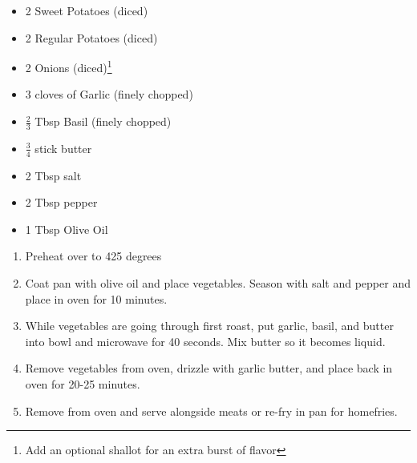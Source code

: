 \documentclass[oneside]{recipe}
\newcommand{\recipecolumn}[2]{
	\begin{multicols}{2}
	\raggedcolumns
	#1
	\columnbreak
	#2
	\end{multicols}
}
\begin{document}
\newpage
{}
\recipecolumn{
	\begin{itemize}
		\item 2 Sweet Potatoes (diced)
		\item 2 Regular Potatoes (diced)
		\item 2 Onions (diced)\footnote{Add an optional shallot for an extra burst of flavor}
		\item 3 cloves of Garlic (finely chopped)
		\item $\frac{2}{3}$ Tbsp Basil (finely chopped)
		\item $\frac{3}{4}$ stick butter
		\item 2 Tbsp salt
		\item 2 Tbsp pepper
		\item 1 Tbsp Olive Oil
	\end{itemize}
}{
	\begin{enumerate}
		\item Preheat over to 425 degrees
		\item Coat pan with olive oil and place vegetables. Season with salt and pepper and place in oven for 10 minutes. 
		\item While vegetables are going through first roast, put garlic, basil, and butter into bowl and microwave for 40 seconds. Mix butter so it becomes liquid. 
		\item Remove vegetables from oven, drizzle with garlic butter, and place back in oven for 20-25 minutes.
		\item Remove from oven and serve alongside meats or re-fry in pan for homefries. 
	\end{enumerate}
}
\end{document}
